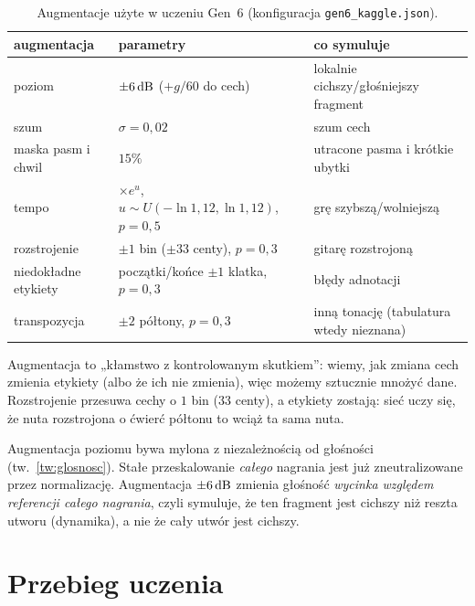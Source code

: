 \begin{table}[ht]
\centering\small
\begin{tabular}{@{}p{3.1cm}p{3.5cm}p{4.3cm}@{}}
\toprule
augmentacja & parametry & co symuluje\\
\midrule
poziom & $\pm6\,\mathrm{dB}$ ($+g/60$ do cech) & lokalnie cichszy/głośniejszy fragment\\
szum & $\sigma=0{,}02$ & szum cech\\
maska pasm i chwil & $15\%$ & utracone pasma i krótkie ubytki\\
tempo & $\times e^{u}$, $u\sim U(-\ln1{,}12,\ln1{,}12)$, $p=0{,}5$ & grę szybszą/wolniejszą\\
rozstrojenie & $\pm1$ bin ($\pm33$ centy), $p=0{,}3$ & gitarę rozstrojoną\\
niedokładne etykiety & początki/końce $\pm1$ klatka, $p=0{,}3$ & błędy adnotacji\\
transpozycja & $\pm2$ półtony, $p=0{,}3$ & inną tonację (tabulatura wtedy nieznana)\\
\bottomrule
\end{tabular}
\caption{Augmentacje użyte w uczeniu Gen~6 (konfiguracja \texttt{gen6\_kaggle.json}).}
\label{tab:augmentacje}
\end{table}

\begin{intuicja}
Augmentacja to „kłamstwo z kontrolowanym skutkiem”: wiemy, jak zmiana cech zmienia etykiety (albo że ich nie zmienia), więc możemy sztucznie mnożyć dane. Rozstrojenie przesuwa cechy o $1$ bin ($33$ centy), a etykiety zostają: sieć uczy się, że nuta rozstrojona o ćwierć półtonu to wciąż ta sama nuta.
\end{intuicja}

\begin{pulapka}
Augmentacja poziomu bywa mylona z niezależnością od głośności (tw.~\ref{tw:glosnosc}). Stałe przeskalowanie \emph{całego} nagrania jest już zneutralizowane przez normalizację. Augmentacja $\pm6\,\mathrm{dB}$ zmienia głośność \emph{wycinka względem referencji całego nagrania}, czyli symuluje, że ten fragment jest cichszy niż reszta utworu (dynamika), a nie że cały utwór jest cichszy.
\end{pulapka}

\section{Przebieg uczenia}

